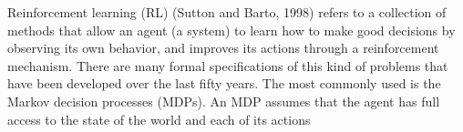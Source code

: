 


Reinforcement learning (RL) (Sutton and Barto, 1998) refers to a collection of methods
that allow an agent (a system) to learn how to make good decisions by observing its
own behavior, and improves its actions through a reinforcement mechanism. There are
many formal specifications of this kind of problems that have been developed over the last
fifty years. The most commonly used is the Markov decision processes (MDPs). An
MDP assumes that the agent has full access to the state of the world and each of its actions







